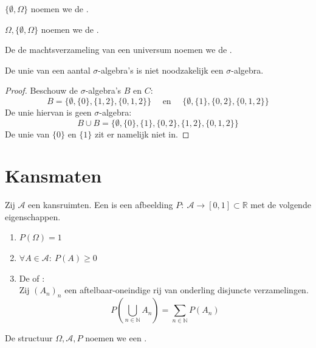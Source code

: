 \documentclass[main.tex]{subfiles}
\begin{document}
\begin{de}
  $\{ \emptyset, \Omega \}$ noemen we de .
\end{de}
\begin{de}
  $\Omega,\{ \emptyset, \Omega \}$ noemen we de .
\end{de}

\begin{de}
  \label{de:discrete-sigma-algebra}
  De de machtsverzameling van een universum noemen we de .
\end{de}

\begin{tvb}
   De unie van een aantal $\sigma$-algebra's is niet noodzakelijk een $\sigma$-algebra.

   \begin{proof}
     Beschouw de $\sigma$-algebra's $B$ en $C$:
     \[ B = \{ \emptyset , \{0\} , \{1,2\}, \{0,1,2\} \} \quad\text{ en }\quad \{ \emptyset , \{1\} , \{0,2\}, \{0,1,2\} \} \]
     De unie hiervan is geen $\sigma$-algebra:
     \[ B \cup B = \{ \emptyset, \{0\}, \{1\}, \{0,2\}, \{1,2\}, \{0,1,2\} \} \]
     De unie van $\{0\}$ en $\{1\}$ zit er namelijk niet in.
   \end{proof}
\end{tvb}

\section{Kansmaten}
\label{sec:kansmaten}

\begin{de}
  Zij $\mathcal{A}$ een kansruimten.
  Een  is een afbeelding $P:\ \mathcal{A} \rightarrow [0,1] \subset \mathbb{R}$ met de volgende eigenschappen.
  \begin{enumerate}
  \item $P(\Omega) = 1$
  \item $\forall A \in \mathcal{A}:\ P(A) \ge 0$
  \item De  of :\\
    Zij $(A_{n})_{n}$ een aftelbaar-oneindige rij van onderling disjuncte verzamelingen.
    \[ P\left( \bigcup_{n\in\mathbb{N}}A_{n} \right) = \sum_{n\in\mathbb{N}}P(A_{n}) \]
  \end{enumerate}
  De structuur $\Omega,\mathcal{A},P$ noemen we een .
\end{de} 
\end{document}
